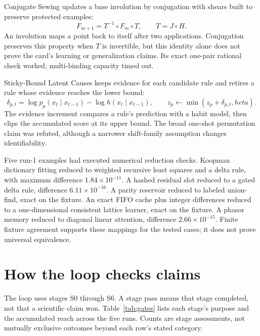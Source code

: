 Conjugate Sewing updates a base involution by conjugation with shears built to preserve protected examples:
\begin{equation}
F_{m+1}=T^{-1}\circ F_m\circ T,\qquad T=J\circ H.
\end{equation}
An involution maps a point back to itself after two applications. Conjugation preserves this property when $T$ is invertible, but this identity alone does not prove the card's learning or generalization claims. Its exact one-pair rational check worked; multi-binding capacity timed out.

Sticky-Bound Latent Causes keeps evidence for each candidate rule and retires a rule whose evidence reaches the lower bound:
\begin{equation}
\delta_{p,t}=\log p_p(x_t\mid x_{t-1})-\log h(x_t\mid x_{t-1}),\qquad z_p\leftarrow\min(z_p+\delta_{p,t},	heta).
\end{equation}
The evidence increment compares a rule's prediction with a habit model, then clips the accumulated score at its upper bound. The broad one-shot permutation claim was refuted, although a narrower shift-family assumption changes identifiability.

Five run-1 examples had executed numerical reduction checks. Koopman dictionary fitting reduced to weighted recursive least squares and a delta rule, with maximum difference $1.84\times10^{-11}$. A hashed residual slot reduced to a gated delta rule, difference $6.11\times10^{-16}$. A parity reservoir reduced to labeled union-find, exact on the fixture. An exact FIFO cache plus integer differences reduced to a one-dimensional consistent lattice learner, exact on the fixture. A phasor memory reduced to diagonal linear attention, difference $2.66\times10^{-15}$. Finite fixture agreement supports these mappings for the tested cases; it does not prove universal equivalence.

\section{How the loop checks claims}

The loop uses stages S0 through S6. A stage pass means that stage completed, not that a scientific claim won. Table~\ref{tab:gates} lists each stage's purpose and the accumulated reach across the five runs. Counts are stage assessments, not mutually exclusive outcomes beyond each row's stated category.

